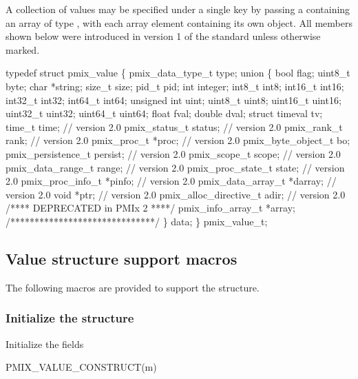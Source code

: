 A collection of values may be specified under a single key by passing a  containing an array of type , with each array element containing its own object. All members shown below were introduced in version 1 of the standard unless otherwise marked.

\cspecificstart
\begin{codepar}
typedef struct pmix_value \{
    pmix_data_type_t type;
    union \{
        bool flag;
        uint8_t byte;
        char *string;
        size_t size;
        pid_t pid;
        int integer;
        int8_t int8;
        int16_t int16;
        int32_t int32;
        int64_t int64;
        unsigned int uint;
        uint8_t uint8;
        uint16_t uint16;
        uint32_t uint32;
        uint64_t uint64;
        float fval;
        double dval;
        struct timeval tv;
        time_t time;                    // version 2.0
        pmix_status_t status;           // version 2.0
        pmix_rank_t rank;               // version 2.0
        pmix_proc_t *proc;              // version 2.0
        pmix_byte_object_t bo;
        pmix_persistence_t persist;     // version 2.0
        pmix_scope_t scope;             // version 2.0
        pmix_data_range_t range;        // version 2.0
        pmix_proc_state_t state;        // version 2.0
        pmix_proc_info_t *pinfo;        // version 2.0
        pmix_data_array_t *darray;      // version 2.0
        void *ptr;                      // version 2.0
        pmix_alloc_directive_t adir;    // version 2.0
        /**** DEPRECATED in PMIx 2 ****/
        pmix_info_array_t *array;
        /******************************/
    \} data;
\} pmix_value_t;
\end{codepar}
\cspecificend

\subsection{Value structure support macros}
The following macros are provided to support the  structure.

\subsubsection{Initialize the  structure}

Initialize the  fields

\cspecificstart
\begin{codepar}
PMIX_VALUE_CONSTRUCT(m)
\end{codepar}
\cspecificend

